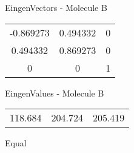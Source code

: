 \begin{multicols}{2}
\begin{center}
\vtab
 EingenVectors - Molecule B     \\
\vtab
\begin{tabular}{|c c c|}
-0.869273	 & 	0.494332	 & 	0	 \\
0.494332	 & 	0.869273	 & 	0	 \\
0	 & 	0	 & 	1
\end{tabular}

\vtab
 EingenValues - Molecule B     \\
\vtab
\begin{tabular}{|c c c|}
118.684	 & 	204.724	 & 	205.419	 \\
\end{tabular}

\end{center}
\end{multicols}
\begin{center}
\vtab
\vtab
\textcolor{NavyBlue}{\Large Equal}
\end{center}

 \newpage

